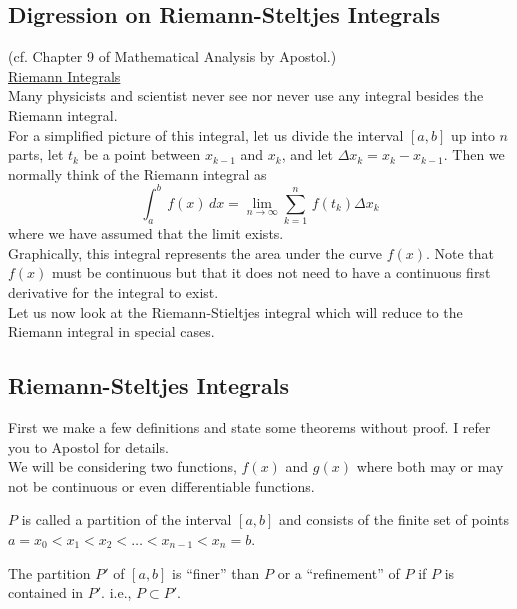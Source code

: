 \subsection{Digression on Riemann-Steltjes Integrals}
(cf. Chapter 9 of Mathematical Analysis by Apostol.)\\
\underline{Riemann Integrals}\\
Many physicists and scientist never see nor never use any integral besides the Riemann integral.\\
For a simplified picture of this integral, let us divide the interval $[a,b]$ up into $n$ parts, let $t_k$ be a point between $x_{k-1}$ and $x_k$, and let $\Delta x_k = x_k - x_{k-1}$. Then we normally think of 
the Riemann integral as 
$$\int_a^b\, f(x)\, dx = \lim_{n\rightarrow\infty} \sum_{k=1}^n\, f(t_k) \Delta x_k$$ where we have assumed that the limit exists.\\
Graphically, this integral represents the area under the curve $f(x)$. Note that $f(x)$ must be continuous but that it does not need to have a continuous first derivative for 
the integral to exist. \\
Let us now look at the Riemann-Stieltjes integral which will reduce to the Riemann integral in special cases. 
\subsection{Riemann-Steltjes Integrals}
First we make a few definitions and state some theorems without proof. I refer you to Apostol for details.\\
We will be considering two functions, $f(x)$ and $g(x)$ where both may or may not be continuous or even differentiable functions. 

\begin{definition} 
$P$ is called a partition of the interval $[a,b]$ and consists of the finite set of points \\  $a=x_0<x_1<x_2<\hdots<x_{n-1}<x_n = b$.
\end{definition}

\begin{definition}
The partition $P'$ of $[a,b]$ is ``finer'' than $P$ or a ``refinement'' of $P$ if $P$ is contained in $P'$. i.e., $P\subset P'$.
\end{definition}

